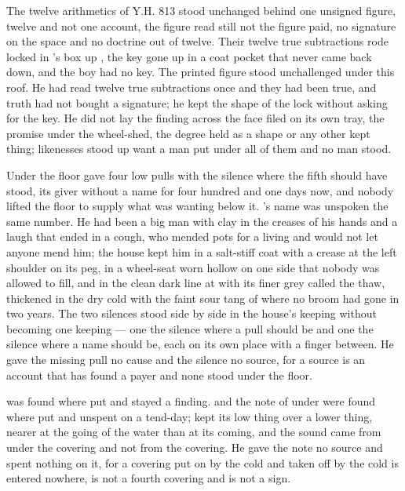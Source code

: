 The twelve arithmetics of Y.H. 813 stood unchanged behind one unsigned figure, twelve and not one account, the figure read still not the figure paid, no signature on the space and no doctrine out of twelve. Their twelve true subtractions rode locked in 's box up , the key gone up in a coat pocket that never came back down, and the boy had no key. The printed figure stood unchallenged under this roof. He had read twelve true subtractions once and they had been true, and truth had not bought a signature; he kept the shape of the lock without asking for the key. He did not lay the finding across the face filed on its own tray, the promise under the wheel-shed, the degree held as a shape or any other kept thing; likenesses stood up want a man put under all of them and no man stood.

Under the floor  gave four low pulls with the silence where the fifth should have stood, its giver without a name for four hundred and one days now, and nobody lifted the floor to supply what was wanting below it. 's name was unspoken the same number. He had been a big man with clay in the creases of his hands and a laugh that ended in a cough, who mended pots for a living and would not let anyone mend him; the house kept him in a salt-stiff coat with a crease at the left shoulder on its peg, in a wheel-seat worn hollow on one side that nobody was allowed to fill, and in the clean dark line at  with its finer grey called the thaw, thickened in the dry cold with the faint sour tang of  where no broom had gone in two years. The two silences stood side by side in the house's keeping without becoming one keeping --- one the silence where a pull should be and one the silence where a name should be, each on its own place with a finger between. He gave the missing pull no cause and the silence no source, for a source is an account that has found a payer and none stood under the floor.

 was found where put and stayed a finding.  and the note of  under  were found where put and unspent on a tend-day;  kept its low thing over a lower thing, nearer at the going of the water than at its coming, and the sound came from under the covering and not from the covering. He gave the note no source and spent nothing on it, for a covering put on by the cold and taken off by the cold is entered nowhere, is not a fourth covering and is not a sign.

